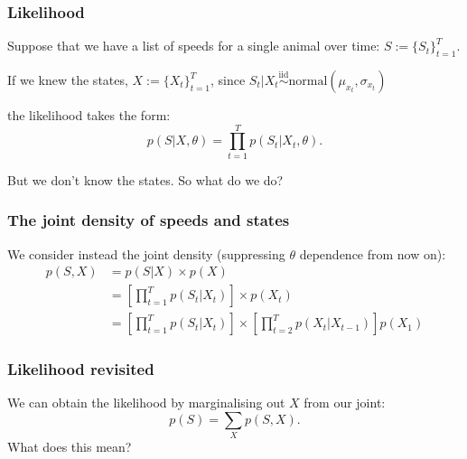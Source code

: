 \documentclass[main.tex]{subfiles}
\begin{document}
\begin{frame}
\frametitle{Likelihood}

Suppose that we have a list of speeds for a single animal over time: $S:=\{S_t\}_{t=1}^T$.

\vspace{0.5cm}

If we knew the states, $X:=\{X_t\}_{t=1}^T$, since $S_t | X_t \overset{\text{iid}}{\sim} \text{normal}(\mu_{x_t}, \sigma_{x_t})$


the likelihood takes the form:
%
\begin{equation}
    p(S|X,\theta) = \prod_{t=1}^T p(S_t | X_t, \theta).
\end{equation}

But we don't know the states. So what do we do?
    
\end{frame}

\begin{frame}
\frametitle{The joint density of speeds and states}

We consider instead the joint density (suppressing $\theta$ dependence from now on):
%
\begin{equation}
    \begin{aligned}
    p(S, X) &= p(S|X) \times p(X)\\
    &= \left[\prod_{t=1}^T p(S_t | X_t)\right] \times p(X_t)\\
    &= \left[\prod_{t=1}^T p(S_t | X_t)\right] \times \left[\prod_{t=2}^T p(X_t | X_{t-1})\right] p(X_1)
    \end{aligned}
\end{equation}
    
\end{frame}

\begin{frame}
\frametitle{Likelihood revisited}

We can obtain the likelihood by marginalising out $X$ from our joint:
%
\begin{equation}
    p(S) = \sum_X p(S,X).
\end{equation}
%
What does this mean?

\end{frame}
\end{document}

